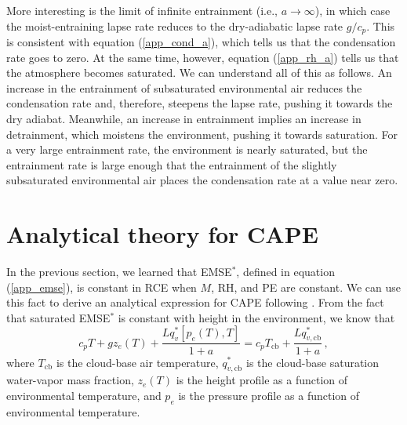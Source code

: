\documentclass[12pt]{article}
\begin{document}
More interesting is the limit of infinite entrainment (i.e., $a \rightarrow \infty$), in which case the moist-entraining lapse rate reduces to the dry-adiabatic lapse rate $g/c_p$.  This is consistent with equation (\ref{app_cond_a}), which tells us that the condensation rate goes to zero.  At the same time, however, equation (\ref{app_rh_a}) tells us that the atmosphere becomes saturated.  We can understand all of this as follows.  An increase in the entrainment of subsaturated environmental air reduces the condensation rate and, therefore, steepens the lapse rate, pushing it towards the dry adiabat.  Meanwhile, an increase in entrainment implies an increase in detrainment, which moistens the environment, pushing it towards saturation.  For a very large entrainment rate, the environment is nearly saturated, but the entrainment rate is large enough that the entrainment of the slightly subsaturated environmental air places the condensation rate at a value near zero.


\section{Analytical theory for CAPE}


In the previous section, we learned that EMSE$^*$, defined in equation (\ref{app_emse}), is constant in RCE when $M$, RH, and PE are constant.  We can use this fact to derive an analytical expression for CAPE following \citet{15cape}.  From the fact that saturated EMSE$^*$ is constant with height in the environment, we know that
\begin{equation}
c_p T + gz_e(T) + \frac{L q_v^*[p_e(T),T]}{1+a} = c_p T_{\text{cb}} + \frac{L q_{v,\text{cb}}^*}{1+a} \, , \label{ze}
\end{equation}
where $T_{\text{cb}}$ is the cloud-base air temperature, $q_{v,\text{cb}}^*$ is the cloud-base saturation water-vapor mass fraction, $z_e(T)$ is the height profile as a function of environmental temperature, and $p_e$ is the pressure profile as a function of environmental temperature.
\end{document}
